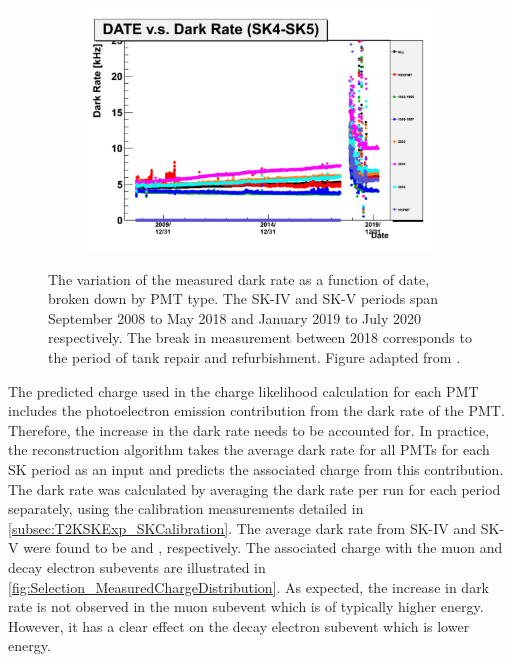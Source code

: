 \begin{figure}[h]
  \begin{subfigure}[t]{\textwidth}
    \includegraphics[width=\textwidth, trim={0mm 0mm 0mm 0mm}, clip, page=1]{Figures/Selections/DarkRate.pdf}
  \end{subfigure}
  \caption{The variation of the measured dark rate as a function of date, broken down by PMT type. The SK-IV and SK-V periods span September 2008 to May 2018 and January 2019 to July 2020 respectively. The break in measurement between 2018 corresponds to the period of tank repair and refurbishment. Figure adapted from \cite{t2k_tn_326}.}
  \label{fig:Selection_DarkRateVariation}
\end{figure}

The predicted charge used in the \fq charge likelihood calculation for each PMT includes the photoelectron emission contribution from the dark rate of the PMT. Therefore, the increase in the dark rate needs to be accounted for. In practice, the reconstruction algorithm takes the average dark rate for all PMTs for each SK period as an input and predicts the associated charge from this contribution. The dark rate was calculated by averaging the dark rate per run for each period separately, using the calibration measurements detailed in \autoref{subsec:T2KSKExp_SKCalibration}. The average dark rate from SK-IV and SK-V were found to be  and , respectively. The associated charge with the muon and decay electron subevents are illustrated in \autoref{fig:Selection_MeasuredChargeDistribution}. As expected, the increase in dark rate is not observed in the muon subevent which is of typically higher energy. However, it has a clear effect on the decay electron subevent which is lower energy.

